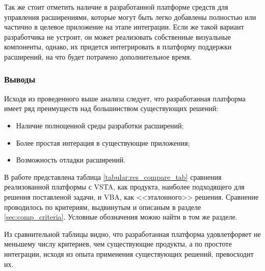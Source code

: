 Так же стоит отметить наличие в разработанной платформе средств для управления расширениями, которые могут быть легко добавлены полностью или частично в целевое приложение на этапе интеграции. Если же такой вариант разработчика не устроит, он может реализовать собственные визуальные компоненты, однако, их придется интегрировать в платформу поддержки расширений, на что будет потрачено дополнительное время.

\subsubsection{Выводы}

Исходя из проведенного выше анализа следует, что разработанная платформа имеет ряд преимуществ над большинством существующих решений:

\begin{itemize}
   \item Наличие полноценной среды разработки расширений;
   \item Более простая интерация в существующие приложения;
   \item Возможность отладки расширений.
\end{itemize}

В работе представлена таблица \ref{tabular:res_compare_tab} сравнения реализованной платформы с VSTA, как продукта, наиболее подходящего для решения поставленой задачи, и VBA, как <<эталонного>> решения. Сравнение проводилось по критериям, выдвинутым и описаным в разделе \ref{sec:comp_criteria}. Условные обозначения можно найти в том же разделе.



Из сравнительной таблицы видно, что разработанная платформа удовлетфоряет не меньшему числу критериев, чем существующие продукты, а по простоте интеграции, исходя из опыта применения существующих решений, превосходит их.

\pagebreak
